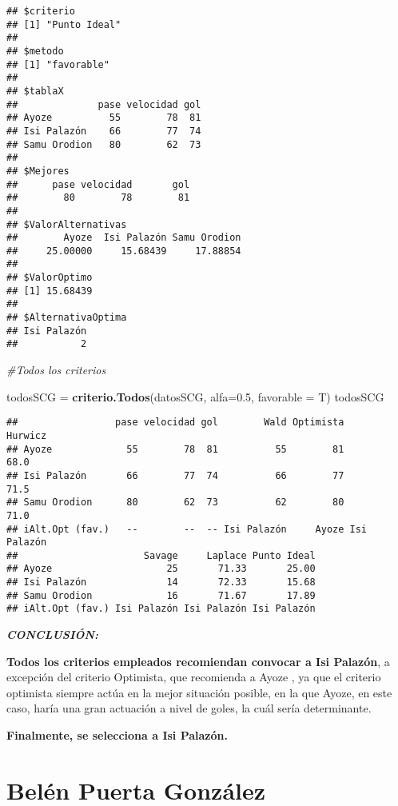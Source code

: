\documentclass[
]{article}
\newenvironment{Shaded}{\begin{snugshade}}{\end{snugshade}}
\newcommand{\AttributeTok}[1]{\textcolor[rgb]{0.13,0.29,0.53}{#1}}
\newcommand{\CommentTok}[1]{\textcolor[rgb]{0.56,0.35,0.01}{\textit{#1}}}
\newcommand{\FloatTok}[1]{\textcolor[rgb]{0.00,0.00,0.81}{#1}}
\newcommand{\FunctionTok}[1]{\textcolor[rgb]{0.13,0.29,0.53}{\textbf{#1}}}
\newcommand{\NormalTok}[1]{#1}
\newcommand{\OtherTok}[1]{\textcolor[rgb]{0.56,0.35,0.01}{#1}}
\begin{document}
\begin{verbatim}
## $criterio
## [1] "Punto Ideal"
## 
## $metodo
## [1] "favorable"
## 
## $tablaX
##              pase velocidad gol
## Ayoze          55        78  81
## Isi Palazón    66        77  74
## Samu Orodion   80        62  73
## 
## $Mejores
##      pase velocidad       gol 
##        80        78        81 
## 
## $ValorAlternativas
##        Ayoze  Isi Palazón Samu Orodion 
##     25.00000     15.68439     17.88854 
## 
## $ValorOptimo
## [1] 15.68439
## 
## $AlternativaOptima
## Isi Palazón 
##           2
\end{verbatim}

\begin{Shaded}
\begin{Highlighting}[]
\CommentTok{\#Todos los criterios}

\NormalTok{todosSCG }\OtherTok{=} \FunctionTok{criterio.Todos}\NormalTok{(datosSCG, }\AttributeTok{alfa=}\FloatTok{0.5}\NormalTok{, }\AttributeTok{favorable =}\NormalTok{ T)}
\NormalTok{todosSCG}
\end{Highlighting}
\end{Shaded}

\begin{verbatim}
##                 pase velocidad gol        Wald Optimista     Hurwicz
## Ayoze             55        78  81          55        81        68.0
## Isi Palazón       66        77  74          66        77        71.5
## Samu Orodion      80        62  73          62        80        71.0
## iAlt.Opt (fav.)   --        --  -- Isi Palazón     Ayoze Isi Palazón
##                      Savage     Laplace Punto Ideal
## Ayoze                    25       71.33       25.00
## Isi Palazón              14       72.33       15.68
## Samu Orodion             16       71.67       17.89
## iAlt.Opt (fav.) Isi Palazón Isi Palazón Isi Palazón
\end{verbatim}

\textbf{\emph{CONCLUSIÓN:}}

\textbf{Todos los criterios empleados recomiendan convocar a Isi
Palazón}, a excepción del criterio Optimista, que recomienda a Ayoze ,
ya que el criterio optimista siempre actúa en la mejor situación
posible, en la que Ayoze, en este caso, haría una gran actuación a nivel
de goles, la cuál sería determinante.

\textbf{Finalmente, se selecciona a Isi Palazón.}

\newpage

\section{Belén Puerta González}\label{beluxe9n-puerta-gonzuxe1lez}
\end{document}
